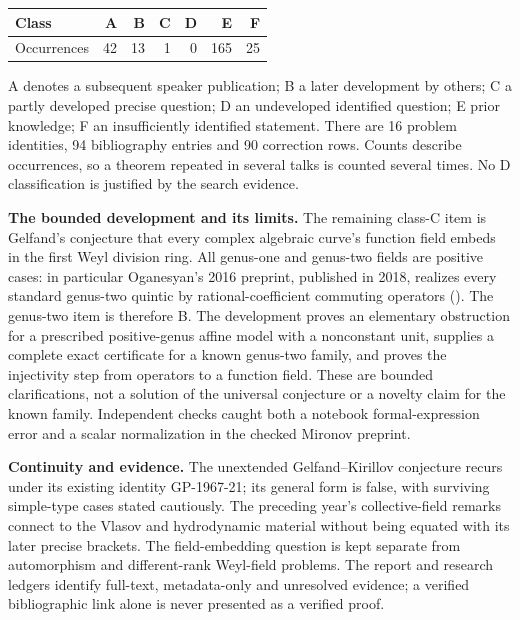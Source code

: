 \begin{center}
\begin{tabular}{lrrrrrr}
\toprule
Class & A & B & C & D & E & F\\
\midrule
Occurrences & 42 & 13 & 1 & 0 & 165 & 25\\
\bottomrule
\end{tabular}
\end{center}
A denotes a subsequent speaker publication; B a later development by others; C a partly developed precise question; D an undeveloped identified question; E prior knowledge; F an insufficiently identified statement. There are 16 problem identities, 94 bibliography entries and 90 correction rows. Counts describe occurrences, so a theorem repeated in several talks is counted several times. No D classification is justified by the search evidence.

\noindent\textbf{The bounded development and its limits.}
The remaining class-C item is Gelfand's conjecture that every complex algebraic curve's function field embeds in the first Weyl division ring. All genus-one and genus-two fields are positive cases: in particular Oganesyan's 2016 preprint, published in 2018, realizes every standard genus-two quintic by rational-coefficient commuting operators (\citealp[Theorem~3]{oganesyan2016rational}). The genus-two item is therefore B. The development proves an elementary obstruction for a prescribed positive-genus affine model with a nonconstant unit, supplies a complete exact certificate for a known genus-two family, and proves the injectivity step from operators to a function field. These are bounded clarifications, not a solution of the universal conjecture or a novelty claim for the known family. Independent checks caught both a notebook formal-expression error and a scalar normalization in the checked Mironov preprint.

\noindent\textbf{Continuity and evidence.}
The unextended Gelfand--Kirillov conjecture recurs under its existing identity GP-1967-21; its general form is false, with surviving simple-type cases stated cautiously. The preceding year's collective-field remarks connect to the Vlasov and hydrodynamic material without being equated with its later precise brackets. The field-embedding question is kept separate from automorphism and different-rank Weyl-field problems. The report and research ledgers identify full-text, metadata-only and unresolved evidence; a verified bibliographic link alone is never presented as a verified proof.
